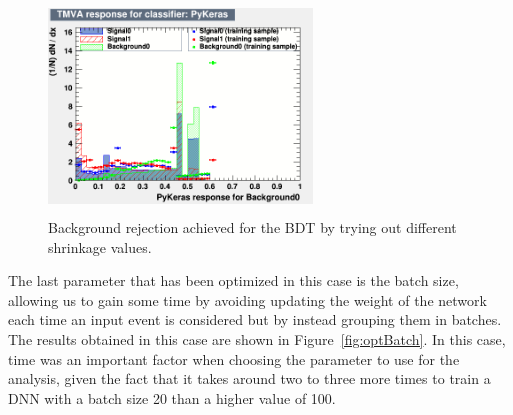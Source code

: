 \documentclass[a4paper, 10pt, openright]{report}
\begin{document}
\begin{appendices}
\begin{figure}[htbp]
{\begin{minipage}[b]{.48\textwidth}
\includegraphics[width=7cm, height=5.7cm]{figs/DNN_learning005.png}
\end{minipage} \hfill
}
\caption{Background rejection achieved for the \ac{BDT} by trying out different shrinkage values.}
\label{fig:optLearning}
\end{figure}

The last parameter that has been optimized in this case is the batch size, allowing us to gain some time by avoiding updating the weight of the network each time an input event is considered but by instead grouping them in batches. The results obtained in this case are shown in Figure~\ref{fig:optBatch}. In this case, time was an important factor when choosing the parameter to use for the analysis, given the fact that it takes around two to three more times to train a \ac{DNN} with a batch size 20 than a higher value of 100.


\end{appendices}
\end{document}
